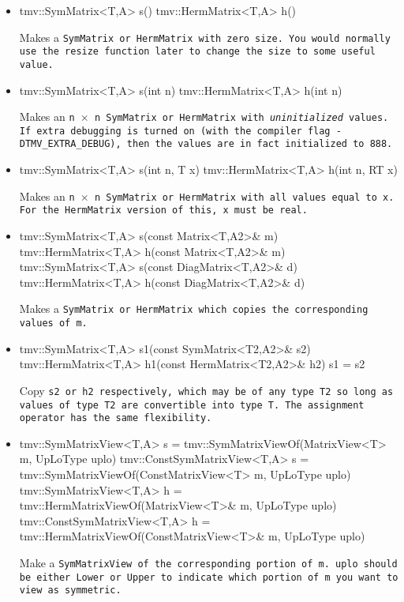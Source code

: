 \begin{itemize}

\item
\begin{tmvcode}
tmv::SymMatrix<T,A> s()
tmv::HermMatrix<T,A> h()
\end{tmvcode}
Makes a \tt{SymMatrix} or \tt{HermMatrix} with zero size.  You would normally use the \tt{resize} function later to
change the size to some useful value.

\item 
\begin{tmvcode}
tmv::SymMatrix<T,A> s(int n)
tmv::HermMatrix<T,A> h(int n)
\end{tmvcode}
Makes an \tt{n} $\times$ \tt{n} \tt{SymMatrix} or \tt{HermMatrix}
with {\em uninitialized} values.
If extra debugging is turned on (with the compiler flag \tt{-DTMV\_EXTRA\_DEBUG}), then the values are in fact initialized to 888.  

\item
\begin{tmvcode}
tmv::SymMatrix<T,A> s(int n, T x)
tmv::HermMatrix<T,A> h(int n, RT x)
\end{tmvcode}
Makes an \tt{n} $\times$ \tt{n} \tt{SymMatrix} or \tt{HermMatrix} 
with all values equal to \tt{x}.
For the \tt{HermMatrix} version of this, \tt{x} must be real.

\item 
\begin{tmvcode}
tmv::SymMatrix<T,A> s(const Matrix<T,A2>& m)
tmv::HermMatrix<T,A> h(const Matrix<T,A2>& m)
tmv::SymMatrix<T,A> s(const DiagMatrix<T,A2>& d)
tmv::HermMatrix<T,A> h(const DiagMatrix<T,A2>& d)
\end{tmvcode}
Makes a \tt{SymMatrix} or \tt{HermMatrix} which copies the corresponding values of \tt{m}.

\item
\begin{tmvcode}
tmv::SymMatrix<T,A> s1(const SymMatrix<T2,A2>& s2)
tmv::HermMatrix<T,A> h1(const HermMatrix<T2,A2>& h2)
s1 = s2
\end{tmvcode}
Copy \tt{s2} or \tt{h2} respectively, which may be of any type \tt{T2} so long
as values of type \tt{T2} are convertible into type \tt{T}.
The assignment operator has the same flexibility.

\item
\begin{tmvcode}
tmv::SymMatrixView<T,A> s = 
      tmv::SymMatrixViewOf(MatrixView<T> m, UpLoType uplo)
tmv::ConstSymMatrixView<T,A> s = 
      tmv::SymMatrixViewOf(ConstMatrixView<T> m, UpLoType uplo)
tmv::SymMatrixView<T,A> h = 
      tmv::HermMatrixViewOf(MatrixView<T>& m, UpLoType uplo)
tmv::ConstSymMatrixView<T,A> h = 
      tmv::HermMatrixViewOf(ConstMatrixView<T>& m, UpLoType uplo)
\end{tmvcode}
Make a \tt{SymMatrixView} of the corresponding portion of \tt{m}.
\tt{uplo} should be either \tt{Lower} or \tt{Upper} to indicate which
portion of \tt{m} you want to view as symmetric.


\end{itemize}
